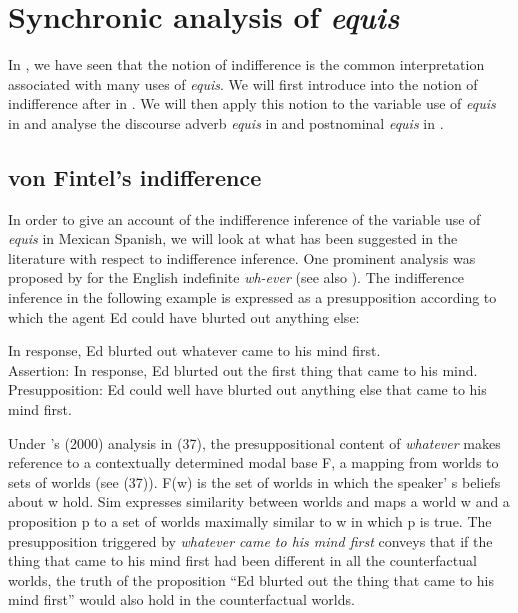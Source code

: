 \documentclass[output=paper
,modfonts
,nonflat]{langsci/langscibook}
\begin{document}
\section{Synchronic analysis of \textit{equis}}\label{sec:kellert:3}
In , we have seen that the notion of indifference is the common interpretation associated with many uses of \textit{equis}. We will first introduce into the notion of indifference after \cite{Fintel2000} in . We will then apply this notion to the variable use of \textit{equis} in  and analyse the discourse adverb \textit{equis} in  and postnominal \textit{equis} in .

\subsection{von Fintel’s indifference}\label{sec:kellert:3.1}
In order to give an account of the indifference inference of the variable use of \textit{equis} in Mexican Spanish, we will look at what has been suggested in the literature with respect to indifference inference. One prominent analysis was proposed by \citep{Fintel2000} for the English indefinite \textit{wh-ever} (see also \citealt{Condoravdi2005}). The indifference inference in the following example is expressed as a presupposition according to which the agent Ed could have blurted out anything else:

\ea In response, Ed blurted out whatever came to his mind first.\\
	Assertion: In response, Ed blurted out the first thing that came to his mind.\\
	Presupposition: Ed could well have blurted out anything else that came to his mind first.
\z

Under \citeauthor{Fintel2000}’s (2000) analysis in (37), the presuppositional content of \textit{whatever} makes reference to a contextually determined modal base F, a mapping from worlds to sets of worlds (see (37)). F(w) is the set of worlds in which the speaker' s beliefs about w hold. Sim expresses similarity between worlds and maps a world w and a proposition p to a set of worlds maximally similar to w in which p is true. The presupposition triggered by \textit{whatever came to his mind first} conveys that if the thing that came to his mind first had been different in all the counterfactual worlds, the truth of the proposition “Ed blurted out the thing that came to his mind first” would also hold in the counterfactual worlds.
\end{document}
